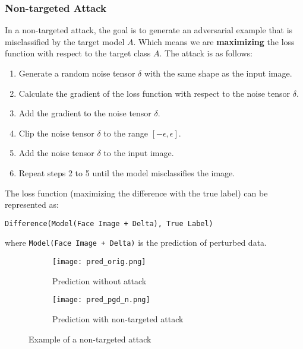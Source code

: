 \subsubsection{Non-targeted Attack}

In a non-targeted attack, the goal is to generate an adversarial example that is misclassified by the target model $A$. Which means we are \textbf{maximizing} the loss function with respect to the target class $A$. The attack is as follows:

\begin{enumerate}
    \item Generate a random noise tensor $\delta$ with the same shape as the input image.
    \item Calculate the gradient of the loss function with respect to the noise tensor $\delta$.
    \item Add the gradient to the noise tensor $\delta$.
    \item Clip the noise tensor $\delta$ to the range $[-\epsilon, \epsilon]$.
    \item Add the noise tensor $\delta$ to the input image.
    \item Repeat steps 2 to 5 until the model misclassifies the image.
\end{enumerate}

The loss function (maximizing the difference with the true label) can be represented as:

\begin{center}
    \verb|Difference(Model(Face Image + Delta), True Label)|
\end{center}

where \verb|Model(Face Image + Delta)| is the prediction of perturbed data.


\begin{figure}[htbp]
    \centering
    \begin{subfigure}{0.4\textwidth}
        \centering
        \texttt{[image: pred\_orig.png]}
        \caption{Prediction without attack}
    \end{subfigure}
    \qquad
    \begin{subfigure}{0.4\textwidth}
        \centering
        \texttt{[image: pred\_pgd\_n.png]}
        \caption{Prediction with non-targeted attack}
    \end{subfigure}
    \caption{Example of a non-targeted attack}
    \label{fig:pdf_attack_example}
\end{figure}

